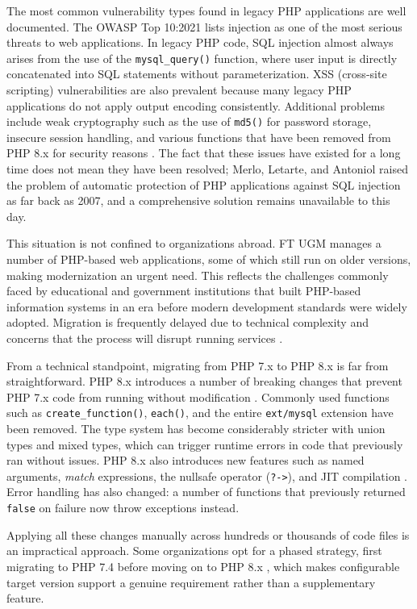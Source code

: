 The most common vulnerability types found in legacy PHP applications are well documented. The OWASP Top 10:2021 \cite{owasp2021} lists injection as one of the most serious threats to web applications. In legacy PHP code, SQL injection almost always arises from the use of the \texttt{mysql\_query()} function, where user input is directly concatenated into SQL statements without parameterization. XSS (cross-site scripting) vulnerabilities are also prevalent because many legacy PHP applications do not apply output encoding consistently. Additional problems include weak cryptography such as the use of \texttt{md5()} for password storage, insecure session handling, and various functions that have been removed from PHP 8.x for security reasons \cite{owasp2021}. The fact that these issues have existed for a long time does not mean they have been resolved; Merlo, Letarte, and Antoniol \cite{merlo2007automated} raised the problem of automatic protection of PHP applications against SQL injection as far back as 2007, and a comprehensive solution remains unavailable to this day.

This situation is not confined to organizations abroad. FT UGM manages a number of PHP-based web applications, some of which still run on older versions, making modernization an urgent need. This reflects the challenges commonly faced by educational and government institutions that built PHP-based information systems in an era before modern development standards were widely adopted. Migration is frequently delayed due to technical complexity and concerns that the process will disrupt running services \cite{phpgroup2022supported}.

From a technical standpoint, migrating from PHP 7.x to PHP 8.x is far from straightforward. PHP 8.x introduces a number of breaking changes that prevent PHP 7.x code from running without modification \cite{phpgroup2022supported}. Commonly used functions such as \texttt{create\_function()}, \texttt{each()}, and the entire \texttt{ext/mysql} extension have been removed. The type system has become considerably stricter with union types and mixed types, which can trigger runtime errors in code that previously ran without issues. PHP 8.x also introduces new features such as named arguments, \textit{match} expressions, the nullsafe operator (\texttt{?->}), and JIT compilation \cite{phpgroup2022supported}. Error handling has also changed: a number of functions that previously returned \texttt{false} on failure now throw exceptions instead.

Applying all these changes manually across hundreds or thousands of code files is an impractical approach. Some organizations opt for a phased strategy, first migrating to PHP 7.4 before moving on to PHP 8.x \cite{phpgroup2022supported}, which makes configurable target version support a genuine requirement rather than a supplementary feature.

